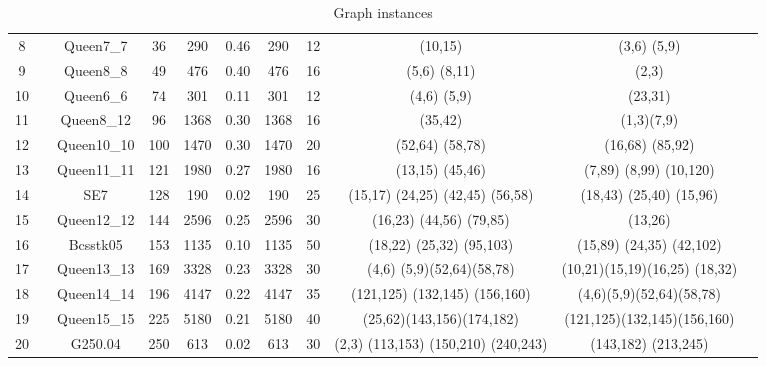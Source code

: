 \begin{landscape}
\begin{center}
\begin{table}[H]
\begin{tabular}{ccc cc cc c c c c}
8	& \citep{chrisWalshaw}	& Queen7\_7  & 36 &  290  & 0.46 		& 290   &  12  &  (10,15) &   (3,6) (5,9) 												\\
9	& \citep{chrisWalshaw}	& Queen8\_8	 & 49 &  476  & 0.40 		& 476   &  16  &  (5,6)  (8,11) & (2,3) 												\\
10	& \citep{chrisWalshaw}	& Queen6\_6	 & 74 &  301  & 0.11 		& 301   &  12  &  (4,6)  (5,9) & (23,31) 												\\
11	& \citep{chrisWalshaw}	& Queen8\_12 & 96 &  1368  & 0.30 		&  1368 &  16  &  (35,42) & (1,3)(7,9) 												\\
12	& \citep{chrisWalshaw}	& Queen10\_10 & 100 &  1470  & 0.30 	& 1470  &  20  &  (52,64)  (58,78) &        (16,68) (85,92) 						\\
\hline                                                              
13	& \citep{chrisWalshaw}	& Queen11\_11 & 121 &  1980  & 0.27 	& 1980  &  16  &  (13,15)  (45,46) &        (7,89)   (8,99)   (10,120) 				 \\
14	& \citep{dimacs10}	& SE7 & 128 &  190  & 0.02 					& 190   &  25  &  (15,17)  (24,25)  (42,45)  (56,58) &       (18,43)   (25,40)   (15,96) 		\\
15	& \citep{chrisWalshaw}	& Queen12\_12 & 144 &  2596  & 0.25 	& 2596  &  30  &  (16,23)  (44,56)  (79,85) &       (13,26) 						\\
16	& \citep{dimacs10}	& Bcsstk05 & 153 &  1135  & 0.10 			& 1135  &  50  &  (18,22)  (25,32)  (95,103) &      (15,89)   (24,35)   (42,102) 			\\
17	& \citep{chrisWalshaw}	& Queen13\_13 & 169 &  3328  & 0.23 	& 3328  &  30  &  (4,6)  (5,9)(52,64)(58,78) &(10,21)(15,19)(16,25)   (18,32) 		\\
18	& \citep{chrisWalshaw}	& Queen14\_14 & 196 &  4147  & 0.22 	& 4147  &  35  &  (121,125)  (132,145)  (156,160) &(4,6)(5,9)(52,64)(58,78) 		\\
19	& \citep{chrisWalshaw}	& Queen15\_15 & 225 &  5180  & 0.21 	& 5180  &  40  &(25,62)(143,156)(174,182)&(121,125)(132,145)(156,160) 				\\
20	& \citep{dimacs10}	& G250.04 & 250 &  613  & 0.02 				& 613   &  30  &  (2,3)  (113,153)  (150,210)  (240,243) &   (143,182)   (213,245) 			\\
\hline
\end{tabular} 
\caption{\label{GraphInstances} Graph instances}
\end{table}
\end{center}
\end{landscape}


